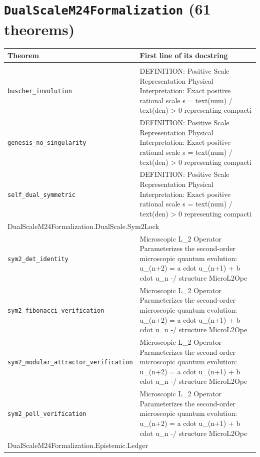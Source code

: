 \section*{\texttt{DualScaleM24Formalization} (61 theorems)}
\begin{longtable}{p{}p{}}\toprule Theorem & First line of its docstring \\ \midrule\endhead\bottomrule\endfoot
\multicolumn{2}{l}{\textsf{\small DualScaleM24Formalization.DualScale.EffectiveMetric}} \\
\quad\texttt{\footnotesize buscher\_involution} & {\footnotesize DEFINITION: Positive Scale Representation Physical Interpretation: Exact positive rational scale s =  text(num) /  text(den) > 0 representing compacti} \\
\quad\texttt{\footnotesize genesis\_no\_singularity} & {\footnotesize DEFINITION: Positive Scale Representation Physical Interpretation: Exact positive rational scale s =  text(num) /  text(den) > 0 representing compacti} \\
\quad\texttt{\footnotesize self\_dual\_symmetric} & {\footnotesize DEFINITION: Positive Scale Representation Physical Interpretation: Exact positive rational scale s =  text(num) /  text(den) > 0 representing compacti} \\
\multicolumn{2}{l}{\textsf{\small DualScaleM24Formalization.DualScale.Sym2Lock}} \\
\quad\texttt{\footnotesize sym2\_det\_identity} & {\footnotesize Microscopic L\_2 Operator Parameterizes the second-order microscopic quantum evolution: u\_(n+2) = a  cdot u\_(n+1) + b  cdot u\_n -/ structure MicroL2Ope} \\
\quad\texttt{\footnotesize sym2\_fibonacci\_verification} & {\footnotesize Microscopic L\_2 Operator Parameterizes the second-order microscopic quantum evolution: u\_(n+2) = a  cdot u\_(n+1) + b  cdot u\_n -/ structure MicroL2Ope} \\
\quad\texttt{\footnotesize sym2\_modular\_attractor\_verification} & {\footnotesize Microscopic L\_2 Operator Parameterizes the second-order microscopic quantum evolution: u\_(n+2) = a  cdot u\_(n+1) + b  cdot u\_n -/ structure MicroL2Ope} \\
\quad\texttt{\footnotesize sym2\_pell\_verification} & {\footnotesize Microscopic L\_2 Operator Parameterizes the second-order microscopic quantum evolution: u\_(n+2) = a  cdot u\_(n+1) + b  cdot u\_n -/ structure MicroL2Ope} \\
\multicolumn{2}{l}{\textsf{\small DualScaleM24Formalization.Epistemic.Ledger}} \\

\end{longtable}
